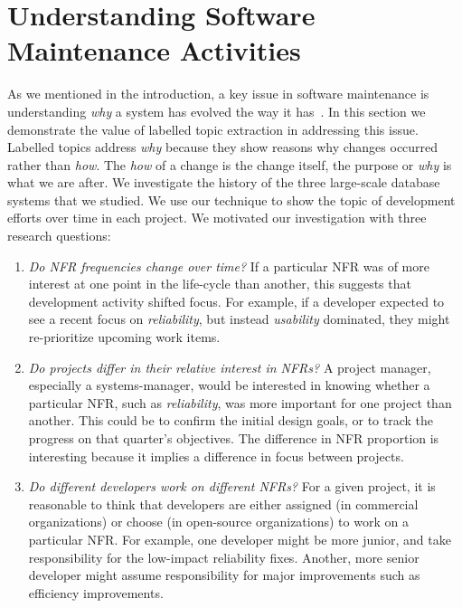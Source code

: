 \documentclass[smallextended]{svjour3}       %
\begin{document}
\section{Understanding Software Maintenance Activities} 
\label{sec:analysis}
As we mentioned in the introduction, a key issue in software maintenance is understanding \emph{why} a system has evolved the way it has~\cite{aranda09icse}. 
In this section we demonstrate the value of labelled topic extraction
in addressing this issue. 
Labelled topics address \emph{why}  because they show reasons why changes
occurred rather than \emph{how}. 
The \emph{how} of a change is the change itself, the purpose or
\emph{why} is what we are after.
We investigate the history of the three large-scale database systems that we studied. 
We use our technique to show the topic of development efforts over time in each project.
We motivated our investigation with three research questions:
\begin{enumerate}
\item \emph{Do NFR frequencies change over time?} If a particular NFR
  was of more interest at one point in the life-cycle than another,
  this suggests that development activity shifted focus. For example,
  if a developer expected to see a recent focus on \emph{reliability},
  but instead \emph{usability} dominated, they might re-prioritize
  upcoming work items.

\item \emph{Do projects differ in their relative interest in NFRs?} A
  project manager, especially a systems-manager, would be interested
  in knowing whether a particular NFR, such as \emph{reliability}, was
  more important for one project than another. This could be to
  confirm the initial design goals, or to track the progress on that
  quarter's objectives.  The difference in NFR proportion is
  interesting because it implies a difference in focus between projects.

\item \emph{Do different developers work on different NFRs?} For a given project, it is reasonable to think that developers are either assigned
(in commercial organizations) or choose (in open-source organizations) to work on a particular NFR. For example, one developer might be more junior, and take
responsibility for the low-impact reliability fixes. Another, more senior developer might assume responsibility for major improvements such as efficiency
improvements. 

\end{enumerate}
\end{document}
